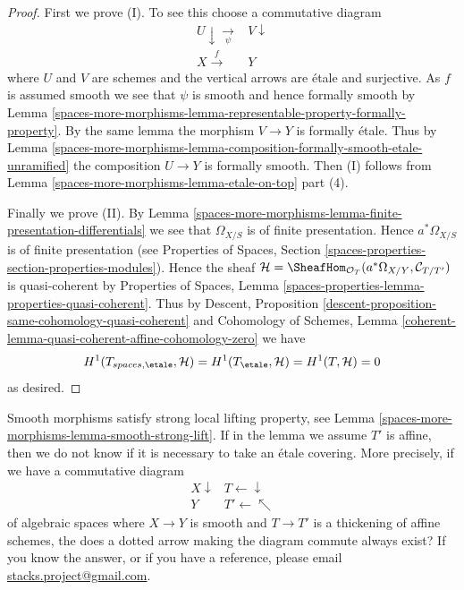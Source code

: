 \begin{proof}
\medskip\noindent
First we prove (I). To see this choose a commutative diagram
$$
\begin{array}{cc}U \downarrow\underset{\psi}{\longrightarrow} & V \downarrow \\ X \overset{f}{\longrightarrow} & Y\end{array}
$$
where $U$ and $V$ are schemes and the vertical arrows are \'etale and
surjective. As $f$ is assumed smooth we see that $\psi$ is smooth and
hence formally smooth by
Lemma \ref{spaces-more-morphisms-lemma-representable-property-formally-property}.
By the same lemma the morphism $V \to Y$ is formally \'etale. Thus by
Lemma \ref{spaces-more-morphisms-lemma-composition-formally-smooth-etale-unramified}
the composition $U \to Y$ is formally smooth. Then (I) follows from
Lemma \ref{spaces-more-morphisms-lemma-etale-on-top} part (4).

\medskip\noindent
Finally we prove (II). By
Lemma \ref{spaces-more-morphisms-lemma-finite-presentation-differentials}
we see that $\Omega_{X/S}$ is of finite presentation.
Hence $a^*\Omega_{X/S}$ is of finite presentation (see
Properties of Spaces,
Section \ref{spaces-properties-section-properties-modules}).
Hence the sheaf
$\mathcal{H} =
\SheafHom_{\mathcal{O}_T}(a^*\Omega_{X/Y}, \mathcal{C}_{T/T'})$
is quasi-coherent by
Properties of Spaces,
Lemma \ref{spaces-properties-lemma-properties-quasi-coherent}.
Thus by
Descent, Proposition \ref{descent-proposition-same-cohomology-quasi-coherent}
and Cohomology of Schemes, Lemma
\ref{coherent-lemma-quasi-coherent-affine-cohomology-zero}
we have
$$
H^1(T_{spaces, \etale}, \mathcal{H}) =
H^1(T_\etale, \mathcal{H}) =
H^1(T, \mathcal{H}) = 0
$$
as desired.
\end{proof}

Smooth morphisms satisfy strong local lifting property, see
Lemma \ref{spaces-more-morphisms-lemma-smooth-strong-lift}. If in the lemma we
assume $T'$ is affine, then
we do not know if it is necessary to take an \'etale covering.
More precisely, if we have a commutative diagram
$$
\begin{array}{cc}X \downarrow & T \longleftarrow\downarrow \\ Y & T' \longleftarrow\nwarrow\end{array}
$$
of algebraic spaces where $X \to Y$ is smooth
and $T \to T'$ is a thickening of affine schemes,
the does a dotted arrow making the diagram commute
always exist? If you know the answer, or if you have a reference, please email
\href{mailto:stacks.project@gmail.com}{stacks.project@gmail.com}.

